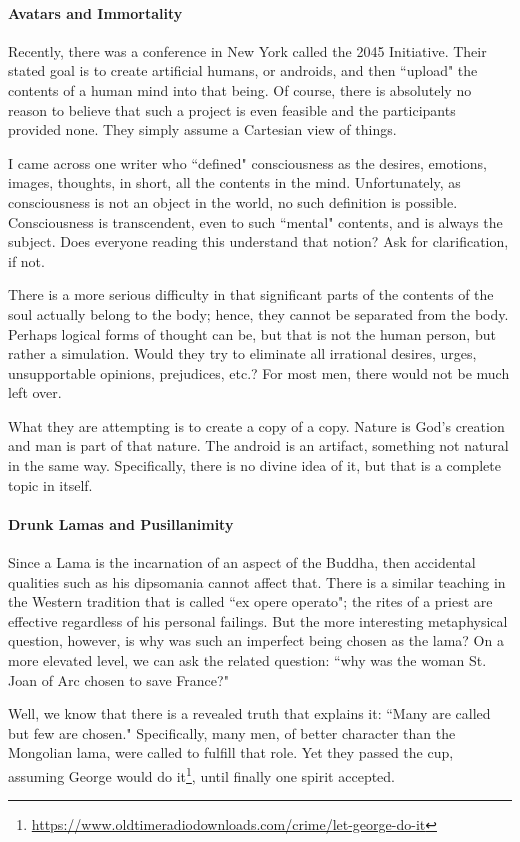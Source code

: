\paragraph{Avatars and Immortality}
Recently, there was a conference in New York called the 2045 Initiative. Their stated goal is to create artificial humans, or androids, and then ``upload" the contents of a human mind into that being. Of course, there is absolutely no reason to believe that such a project is even feasible and the participants provided none. They simply assume a Cartesian view of things.

I came across one writer who ``defined" consciousness as the desires, emotions, images, thoughts, in short, all the contents in the mind. Unfortunately, as consciousness is not an object in the world, no such definition is possible. Consciousness is transcendent, even to such ``mental" contents, and is always the subject. Does everyone reading this understand that notion? Ask for clarification, if not.

There is a more serious difficulty in that significant parts of the contents of the soul actually belong to the body; hence, they cannot be separated from the body. Perhaps logical forms of thought can be, but that is not the human person, but rather a simulation. Would they try to eliminate all irrational desires, urges, unsupportable opinions, prejudices, etc.? For most men, there would not be much left over.

What they are attempting is to create a copy of a copy. Nature is God's creation and man is part of that nature. The android is an artifact, something not natural in the same way. Specifically, there is no divine idea of it, but that is a complete topic in itself.

\paragraph{Drunk Lamas and Pusillanimity}
Since a Lama is the incarnation of an aspect of the Buddha, then accidental qualities such as his dipsomania cannot affect that. There is a similar teaching in the Western tradition that is called ``ex opere operato"; the rites of a priest are effective regardless of his personal failings. But the more interesting metaphysical question, however, is why was such an imperfect being chosen as the lama? On a more elevated level, we can ask the related question: ``why was the woman St. Joan of Arc chosen to save France?"

Well, we know that there is a revealed truth that explains it: ``Many are called but few are chosen." Specifically, many men, of better character than the Mongolian lama, were called to fulfill that role. Yet they passed the cup, assuming George would do it\footnote{\url{https://www.oldtimeradiodownloads.com/crime/let-george-do-it}}, until finally one spirit accepted.

